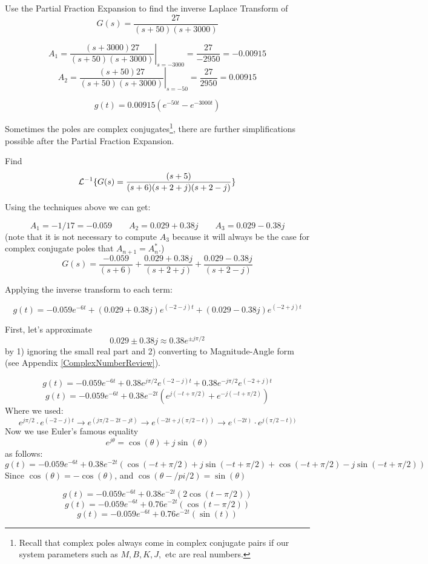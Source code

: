 \begin{ExampleSmall}
Use the Partial Fraction Expansion to find the inverse Laplace Transform of
\[
G(s) =  \frac          {27}             {(s+50)(s+3000)}
\]


\[
A_1 = \left . \frac {(s+3000)27}{(s+50)(s+3000)} \right |_{s=-3000} = \frac {27}{-2950} = -0.00915
\]
\[
A_2 = \left . \frac {(s+50)27}{(s+50)(s+3000)} \right |_{s=-50} = \frac {27}{2950} = 0.00915
\]

\[
g(t) = 0.00915(e^{-50t}-e^{-3000t})
\]

\end{ExampleSmall}



Sometimes the poles are complex conjugates\footnote{Recall that complex poles always come in complex conjugate pairs if our
system parameters such as $M,B,K,J,$ etc are real numbers.}, there are further simplifications possible after the Partial Fraction Expansion.




\begin{Example}\label{Ex:2ndOrderInvTrans}

Find
\[
\mathcal{L}^{-1}\{G(s) = \frac{(s+5)}{(s+6)(s+2+j)(s+2-j)}\}
\]

\vspace{0.25in}

Using the techniques above we can get:

\[
A_1 = -1/17 = -0.059 \qquad A_2 = 0.029+0.38j \qquad A_3 = 0.029-0.38j
\]
(note that it is not necessary to compute $A_3$ because it will always be the case for complex conjugate poles that $A_{n+1} = A_n^*$.)
\[
G(s)  = \frac {-0.059} {(s+6)}  + \frac {0.029+0.38j} {(s+2+j)}  + \frac {0.029-0.38j} {(s+2-j)}
\]

Applying the inverse transform to each term:

\[
g(t) = -0.059e^{-6t} + (0.029+0.38j)e^{(-2-j)t}+ (0.029-0.38j)e^{(-2+j)t}
\]

First, let's approximate
\[
0.029\pm 0.38j \approx 0.38e^{\pm j \pi/2}
\]
by 1) ignoring the small real part and
2) converting to Magnitude-Angle form (see Appendix \ref{ComplexNumberReview}).

\[
g(t) = -0.059e^{-6t} + 0.38e^{j\pi/2}e^{(-2-j)t} + 0.38e^{-j\pi/2}e^{(-2+j)t}
\]
\[
g(t) = -0.059e^{-6t} + 0.38e^{-2t} \left ( e^{j(-t+\pi/2)}+e^{-j(-t+\pi/2)} \right )
\]
Where we used:
\[
e^{j\pi/2}\cdot e^{(-2-j)t} \to e^{(j\pi/2-2t-jt)} \to e^{(-2t+j(\pi/2-t))} \to  e^{(-2t)}\cdot e^{j(\pi/2-t))}
\]
Now we use Euler's famous equality
\[
e^{j\theta} = \cos(\theta) + j \sin(\theta)
\]
as follows:
\[
g(t) = -0.059e^{-6t} + 0.38e^{-2t} \left (
    \cos(-t+\pi/2) + j\sin(-t+\pi/2)+
    \cos(-t+\pi/2) - j\sin(-t+\pi/2)
    \right )
\]
Since $\cos(\theta) = -\cos(\theta)$, and $\cos(\theta-/pi/2) = \sin(\theta)$

\[
g(t) = -0.059e^{-6t} + 0.38e^{-2t} \left (
    2\cos(t-\pi/2)
    \right )
\]
\[
g(t) = -0.059e^{-6t} + 0.76e^{-2t} \left (
    \cos(t-\pi/2)
    \right )
\]
\[
g(t) = -0.059e^{-6t} + 0.76e^{-2t} \left (  \sin(t)  \right )
\]

\end{Example}



